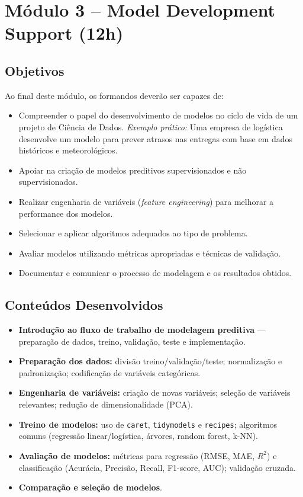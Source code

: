 \section{\textcolor{sectionred}{Módulo 3 – Model Development Support (12h)}}

\subsection{\textcolor{subsectionblue}{Objetivos}}
Ao final deste módulo, os formandos deverão ser capazes de:
\begin{itemize}
  \item Compreender o papel do desenvolvimento de modelos no ciclo de vida de um projeto de Ciência de Dados.  
  \textit{Exemplo prático:} Uma empresa de logística desenvolve um modelo para prever atrasos nas entregas com base em dados históricos e meteorológicos.
  \item Apoiar na criação de modelos preditivos supervisionados e não supervisionados.  
  \item Realizar engenharia de variáveis (\textit{feature engineering}) para melhorar a performance dos modelos.  
  \item Selecionar e aplicar algoritmos adequados ao tipo de problema.  
  \item Avaliar modelos utilizando métricas apropriadas e técnicas de validação.  
  \item Documentar e comunicar o processo de modelagem e os resultados obtidos.
\end{itemize}

\subsection{\textcolor{subsectionblue}{Conteúdos Desenvolvidos}}
\begin{itemize}
  \item \textbf{Introdução ao fluxo de trabalho de modelagem preditiva} — preparação de dados, treino, validação, teste e implementação.
  \item \textbf{Preparação dos dados:} divisão treino/validação/teste; normalização e padronização; codificação de variáveis categóricas.
  \item \textbf{Engenharia de variáveis:} criação de novas variáveis; seleção de variáveis relevantes; redução de dimensionalidade (PCA).
  \item \textbf{Treino de modelos:} uso de \texttt{caret}, \texttt{tidymodels} e \texttt{recipes}; algoritmos comuns (regressão linear/logística, árvores, random forest, k-NN).
  \item \textbf{Avaliação de modelos:} métricas para regressão (RMSE, MAE, $R^2$) e classificação (Acurácia, Precisão, Recall, F1-score, AUC); validação cruzada.
  \item \textbf{Comparação e seleção de modelos}.
\end{itemize}

